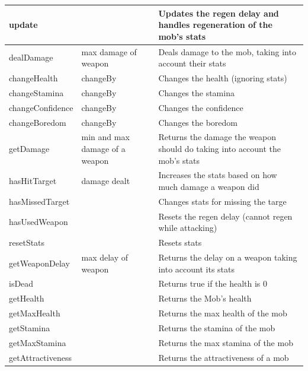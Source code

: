\documentclass{article}
\begin{document}
\begin{center}
\begin{tabular}{ | m{} | m{}| m{} | }
                        \hline
                        update & & Updates the regen delay and handles regeneration of the mob's stats \\
                        \hline
                        dealDamage & max damage of weapon & Deals damage to the mob, taking into account their stats \\
                        \hline
                        changeHealth & changeBy & Changes the health (ignoring stats) \\
                        \hline
                        changeStamina & changeBy & Changes the stamina \\
                        \hline
                        changeConfidence & changeBy & Changes the confidence \\
                        \hline
                        changeBoredom & changeBy & Changes the boredom \\
                        \hline
                        getDamage & min and max damage of a weapon & Returns the damage the weapon should do taking into account the mob's stats \\
                        \hline
                        hasHitTarget & damage dealt & Increases the stats based on how much damage a weapon did \\
                        \hline
                        hasMissedTarget & & Changes stats for missing the targe \\
                        \hline
                        hasUsedWeapon & & Resets the regen delay (cannot regen while attacking) \\
                        \hline
                        resetStats & & Resets stats \\
                        \hline
                        getWeaponDelay & max delay of weapon & Returns the delay on a weapon taking into account its stats \\
                        \hline
                        isDead & & Returns true if the health is 0 \\
                        \hline
                        getHealth & & Returns the Mob's health \\
                        \hline
                        getMaxHealth & & Returns the max health of the mob \\
                        \hline
                        getStamina & & Returns the stamina of the mob \\
                        \hline
                        getMaxStamina & & Returns the max stamina of the mob \\
                        \hline
                        getAttractiveness & & Returns the attractiveness of a mob \\
                        \hline
                    \end{tabular}
                \end{center}
\end{document}

